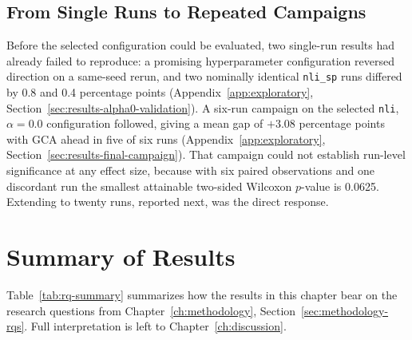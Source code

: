 \subsection{From Single Runs to Repeated Campaigns}

Before the selected configuration could be evaluated, two single-run results had
already failed to reproduce: a promising hyperparameter configuration reversed
direction on a same-seed rerun, and two nominally identical \texttt{nli\_sp}
runs differed by 0.8 and 0.4 percentage points
(Appendix~\ref{app:exploratory}, Section~\ref{sec:results-alpha0-validation}).
A six-run campaign on the selected \texttt{nli}, $\alpha=0.0$ configuration
followed, giving a mean gap of $+3.08$ percentage points with GCA ahead in five
of six runs (Appendix~\ref{app:exploratory},
Section~\ref{sec:results-final-campaign}). That campaign could not establish
run-level significance at any effect size, because with six paired observations
and one discordant run the smallest attainable two-sided Wilcoxon $p$-value is
0.0625. Extending to twenty runs, reported next, was the direct response.

\section{Summary of Results}
\label{sec:results-summary}

Table~\ref{tab:rq-summary} summarizes how the results in this chapter bear on the
research questions from Chapter~\ref{ch:methodology}, Section~\ref{sec:methodology-rqs}.
Full interpretation is left to Chapter~\ref{ch:discussion}.

